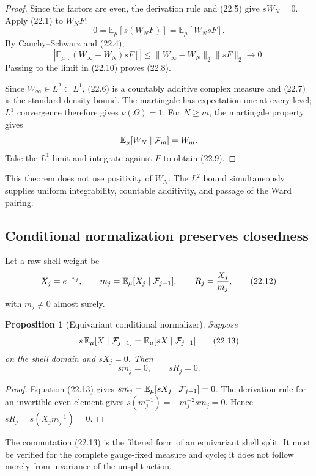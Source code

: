 \documentclass[11pt]{article}
\newtheorem{proposition}[theorem]{Proposition}
\theoremstyle{remark}
\begin{document}
\begin{proof}
Since the factors are even, the derivation rule and (22.5) give
\(sW_N=0\).  Apply (22.1) to \(W_NF\):
\[
 0={\mathbb E}_\mu[s(W_NF)]
  ={\mathbb E}_\mu[W_NsF].                                 \tag{22.10}
\]
By Cauchy--Schwarz and (22.4),
\[
 \left|
 {\mathbb E}_\mu[(W_\infty-W_N)sF]
 \right|
 \le
 \|W_\infty-W_N\|_2\|sF\|_2\longrightarrow0.               \tag{22.11}
\]
Passing to the limit in (22.10) proves (22.8).

Since \(W_\infty\in L^2\subset L^1\), (22.6) is a countably additive
complex measure and (22.7) is the standard density bound.  The
martingale has expectation one at every level; \(L^1\) convergence
therefore gives \(\nu(\Omega)=1\).  For \(N\ge m\), the martingale
property gives
\[
 {\mathbb E}_\mu[W_N\mid{\cal F}_m]=W_m.
\]
Take the \(L^1\) limit and integrate against \(F\) to obtain (22.9).
\end{proof}

This theorem does not use positivity of \(W_N\).  The \(L^2\) bound
simultaneously supplies uniform integrability, countable additivity,
and passage of the Ward pairing.

\subsection{Conditional normalization preserves closedness}

Let a raw shell weight be
\[
 X_j=e^{-v_j},\qquad
 m_j={\mathbb E}_\mu[X_j\mid{\cal F}_{j-1}],\qquad
 R_j=\frac{X_j}{m_j},                                      \tag{22.12}
\]
with \(m_j\ne0\) almost surely.

\begin{proposition}[Equivariant conditional normalizer]
\label{prop:v12v22-normalizer}
Suppose
\[
 s\,{\mathbb E}_\mu[X\mid{\cal F}_{j-1}]
 =
 {\mathbb E}_\mu[sX\mid{\cal F}_{j-1}]                     \tag{22.13}
\]
on the shell domain and \(sX_j=0\).  Then
\[
                         sm_j=0,\qquad sR_j=0.              \tag{22.14}
\]
\end{proposition}

\begin{proof}
Equation (22.13) gives
\(sm_j={\mathbb E}_\mu[sX_j\mid{\cal F}_{j-1}]=0\).
The derivation rule for an invertible even element gives
\(s(m_j^{-1})=-m_j^{-2}sm_j=0\).  Hence
\(sR_j=s(X_jm_j^{-1})=0\).
\end{proof}

The commutation (22.13) is the filtered form of an equivariant shell
split.  It must be verified for the complete gauge-fixed measure and
cycle; it does not follow merely from invariance of the unsplit
action.
\end{document}
